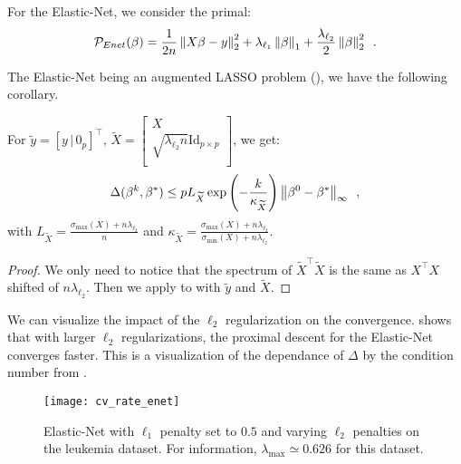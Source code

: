 \documentclass[../main.tex]{subfiles}
\begin{document}
For the Elastic-Net, we consider the primal:
\begin{align}
\mathcal{P}_{Enet}(\beta) = \frac{1}{2n}\left \lVert X\beta - y \right \rVert_2^2
+ \lambda_{\ell_1}\left \lVert \beta \right \rVert_1
+ \frac{\lambda_{\ell_2}}{2}\left \lVert \beta \right \rVert_2^2
\enspace.
\end{align}

The Elastic-Net being an augmented LASSO problem (), we have
the following corollary.

\begin{corollary}\label{cor:enet_kkt}
For $\widetilde y=[y\,|\, 0_p]^\top$,
$\widetilde X =
\begin{bmatrix}
     X \\ \sqrt{\lambda_{\ell_2} n}\mathrm{Id}_{p\times p}\\
\end{bmatrix}$, we get:
\begin{align*}
\Delta(\beta^k, \beta^*)
\leq p L_{\widetilde X}
\exp\left(-\frac{k}{\kappa_{\widetilde{X}}}\right) \left \lVert \beta^0 - \beta^* \right \rVert_\infty
\enspace,
\end{align*}
with $L_{\widetilde X} = \frac{\sigma_{\max}(X) + n\lambda_{\ell_2}}{n}$
and $\kappa_{\widetilde{X}}
= \frac{\sigma_{\max}(X) + n\lambda_{\ell_2}}{\sigma_{\min}(X) + n\lambda_{\ell_2}}.$
\end{corollary}
\begin{proof}
We only need to notice that the spectrum of $\widetilde X^\top \widetilde X$ is the
same as $X^\top X$ shifted of $n\lambda_{\ell_2}$. Then we apply 
to  with $\widetilde y$ and $\widetilde X$.
\end{proof}
We can visualize the impact of the $\ell_2$ regularization on the convergence.
 shows that with larger $\ell_2$ regularizations, the
proximal descent for the Elastic-Net converges faster.
This is a visualization of the dependance of $\Delta$ by the condition number
from .

\begin{figure}[h]
    \centering
    \texttt{[image: cv\_rate\_enet]}
    \caption{Elastic-Net with $\ell_1$ penalty set to $0.5$ and varying $\ell_2$
    penalties on the leukemia dataset.
    For information, $\lambda_{\max}\simeq 0.626$ for this dataset.
    }
    \label{fig:cv_rate_enet}
\end{figure}
\end{document}
